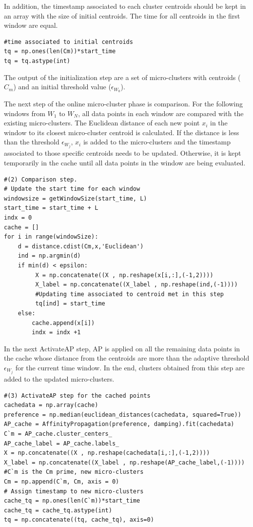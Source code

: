 In addition, the timestamp associated to each cluster centroids should be kept in an array with the size of initial centroids. The time for all centroids in the first window are equal.

\begin{lstlisting}
#time associated to initial centroids
tq = np.ones(len(Cm))*start_time
tq = tq.astype(int)
\end{lstlisting}


The output of the initialization step are a set of micro-clusters with centroids ($C_m$) and an initial threshold value ($\epsilon_{W_0}$).

The next step of the online micro-cluster phase is comparison. For the following windows from $W_1$ to $W_N$, all data points in each window are compared with the existing micro-clusters. The Euclidean distance of each new point $x_i$ in the window to its closest micro-cluster centroid is calculated. If the distance is less than the threshold $\epsilon_{W_j}$, $x_i$ is added to the micro-clusters and the timestamp associated to those specific centroids needs to be updated. Otherwise, it is kept temporarily in the cache until all data points in the window are being evaluated. 

\begin{lstlisting}
#(2) Comparison step.
# Update the start time for each window
windowsize = getWindowSize(start_time, L)
start_time = start_time + L
indx = 0
cache = []
for i in range(windowSize):
    d = distance.cdist(Cm,x,'Euclidean')
    ind = np.argmin(d)    
    if min(d) < epsilon:
         X = np.concatenate((X , np.reshape(x[i,:],(-1,2))))
         X_label = np.concatenate((X_label , np.reshape(ind,(-1))))
         #Updating time associated to centroid met in this step
         tq[ind] = start_time
    else:
        cache.append(x[i])       
        indx = indx +1
\end{lstlisting}


In the next ActivateAP step, AP is applied on all the remaining data points in the cache whose distance from the centroids are more than the adaptive threshold $\epsilon_{W_j}$ for the current time window. In the end, clusters obtained from this step are added to the updated micro-clusters.  


\begin{lstlisting}
#(3) ActivateAP step for the cached points
cachedata = np.array(cache)
preference = np.median(euclidean_distances(cachedata, squared=True))
AP_cache = AffinityPropagation(preference, damping).fit(cachedata)
C`m = AP_cache.cluster_centers_
AP_cache_label = AP_cache.labels_
X = np.concatenate((X , np.reshape(cachedata[i,:],(-1,2))))
X_label = np.concatenate((X_label , np.reshape(AP_cache_label,(-1))))
#C`m is the Cm prime, new micro-clusters
Cm = np.append(C`m, Cm, axis = 0)
# Assign timestamp to new micro-clusters
cache_tq = np.ones(len(C`m))*start_time
cache_tq = cache_tq.astype(int)
tq = np.concatenate((tq, cache_tq), axis=0)
\end{lstlisting}


